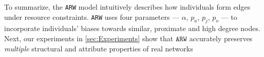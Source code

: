 


To summarize, the \texttt{ARW} model
intuitively describes how individuals form edges under resource constraints.
\texttt{ARW} uses four parameters --- $\alpha$, $p_a$, $p_j$, $p_o$ --- to incorporate
individuals' biases towards similar, proximate and high degree nodes.
Next, our experiments in
\cref{sec:Experiments} show that $\texttt{ARW}$ accurately preserves
\textit{multiple} structural and attribute properties of real networks

